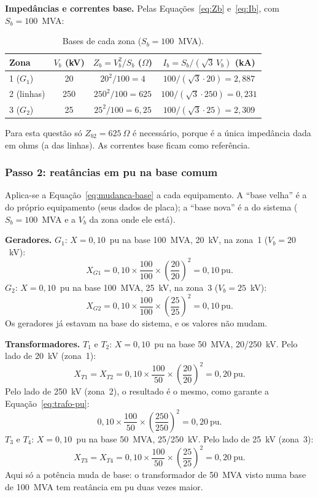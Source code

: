 \documentclass[a4paper,11pt]{article}
\numberwithin{equation}{section}
\numberwithin{figure}{section}
\numberwithin{table}{section}
\newcommand{\passo}[1]{{\color{blue_theme}\bfseries #1}\enspace}
\begin{document}
\passo{Impedâncias e correntes base.} Pelas Equações~\eqref{eq:Zb}
e~\eqref{eq:Ib}, com $S_b = 100$~MVA:

\begin{table}[H]
  \centering
  \begin{tabular}{@{}lccc@{}}
    \toprule
    Zona & $V_b$ (kV) & $Z_b = V_b^2/S_b$ ($\Omega$) & $I_b = S_b/(\sqrt{3}\,V_b)$ (kA) \\
    \midrule
    1 ($G_1$)            & 20  & $20^2/100 = 4$       & $100/(\sqrt{3}\cdot 20) = 2{,}887$ \\
    2 (linhas)           & 250 & $250^2/100 = 625$    & $100/(\sqrt{3}\cdot 250) = 0{,}231$ \\
    3 ($G_2$)            & 25  & $25^2/100 = 6{,}25$  & $100/(\sqrt{3}\cdot 25) = 2{,}309$ \\
    \bottomrule
  \end{tabular}
  \caption{Bases de cada zona ($S_b = 100$~MVA).}
  \label{tab:bases}
\end{table}

Para esta questão só $Z_{b2} = 625~\Omega$ é necessário, porque é a única
impedância dada em ohms (a das linhas). As correntes base ficam como
referência.

\subsubsection{Passo 2: reatâncias em pu na base comum}

Aplica-se a Equação~\eqref{eq:mudanca-base} a cada equipamento. A
\enquote{base velha} é a do próprio equipamento (seus dados de placa); a
\enquote{base nova} é a do sistema ($S_b = 100$~MVA e a $V_b$ da zona
onde ele está).

\passo{Geradores.} $G_1$: $X = 0{,}10$~pu na base 100~MVA, 20~kV, na
zona~1 ($V_b = 20$~kV):
\[
  X_{G1} = 0{,}10 \times \frac{100}{100} \times
           \left(\frac{20}{20}\right)^{2} = 0{,}10~\text{pu}.
\]
$G_2$: $X = 0{,}10$~pu na base 100~MVA, 25~kV, na zona~3 ($V_b = 25$~kV):
\[
  X_{G2} = 0{,}10 \times \frac{100}{100} \times
           \left(\frac{25}{25}\right)^{2} = 0{,}10~\text{pu}.
\]
Os geradores já estavam na base do sistema, e os valores não mudam.

\passo{Transformadores.} $T_1$ e $T_2$: $X = 0{,}10$~pu na base 50~MVA,
20/250~kV. Pelo lado de 20~kV (zona~1):
\[
  X_{T1} = X_{T2} = 0{,}10 \times \frac{100}{50} \times
           \left(\frac{20}{20}\right)^{2} = 0{,}20~\text{pu}.
\]
Pelo lado de 250~kV (zona~2), o resultado é o mesmo, como garante a
Equação~\eqref{eq:trafo-pu}:
\[
  0{,}10 \times \frac{100}{50} \times
  \left(\frac{250}{250}\right)^{2} = 0{,}20~\text{pu}.
\]
$T_3$ e $T_4$: $X = 0{,}10$~pu na base 50~MVA, 25/250~kV. Pelo lado de
25~kV (zona~3):
\[
  X_{T3} = X_{T4} = 0{,}10 \times \frac{100}{50} \times
           \left(\frac{25}{25}\right)^{2} = 0{,}20~\text{pu}.
\]
Aqui só a potência muda de base: o transformador de 50~MVA visto numa base
de 100~MVA tem reatância em pu duas vezes maior.
\end{document}
